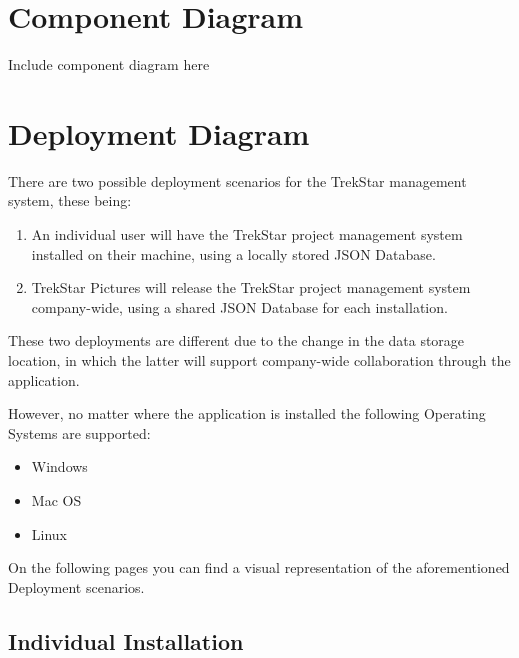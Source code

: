 \documentclass[
  english,
  a4paper,
,tablecaptionabove
]{scrartcl}
\providecommand{\tightlist}{%
  \setlength{\itemsep}{0pt}\setlength{\parskip}{0pt}}
\begin{document}
\newpage

\hypertarget{component-diagram}{%
\section{Component Diagram}\label{component-diagram}}

Include component diagram here

\newpage

\hypertarget{deployment-diagram}{%
\section{Deployment Diagram}\label{deployment-diagram}}

There are two possible deployment scenarios for the TrekStar management
system, these being:

\begin{enumerate}
\def\labelenumi{\arabic{enumi}.}
\tightlist
\item
  An individual user will have the TrekStar project management system
  installed on their machine, using a locally stored JSON Database.
\item
  TrekStar Pictures will release the TrekStar project management system
  company-wide, using a shared JSON Database for each installation.
\end{enumerate}

These two deployments are different due to the change in the data
storage location, in which the latter will support company-wide
collaboration through the application.

However, no matter where the application is installed the following
Operating Systems are supported:

\begin{itemize}
\tightlist
\item
  Windows
\item
  Mac OS
\item
  Linux
\end{itemize}

On the following pages you can find a visual representation of the
aforementioned Deployment scenarios.

\hypertarget{individual-installation}{%
\subsection{Individual Installation}\label{individual-installation}}
\end{document}

